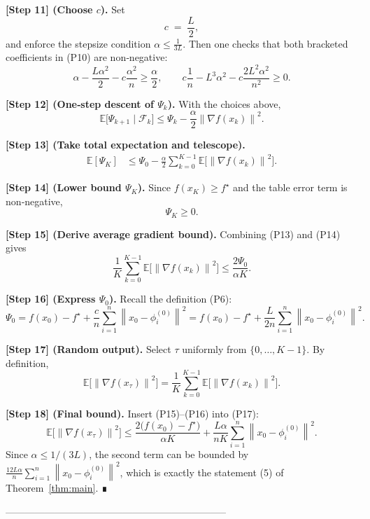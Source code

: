 \documentclass{article}
\newcommand{\E}{\mathbb{E}}
\newcommand{\norm}[1]{\left\|#1\right\|}
\newcommand{\grad}{\nabla}
\begin{document}
\noindent\textbf{[Step 11] (Choose $c$).}  
Set
\[
c \;=\; \frac{L}{2},
\]
and enforce the stepsize condition $\alpha\le \frac{1}{3L}$.  
Then one checks that both bracketed coefficients in (P10) are non‑negative:
\[
\alpha-\frac{L\alpha^{2}}{2}-c\frac{\alpha^{2}}{n}
\ge \frac{\alpha}{2},
\qquad
c\frac1n - L^{3}\alpha^{2}
      -c\frac{2L^{2}\alpha^{2}}{n^{2}}
\ge 0.
\tag{P11}
\]

\noindent\textbf{[Step 12] (One‑step descent of $\Psi_k$).}  
With the choices above,
\[
\E\!\bigl[\Psi_{k+1}\mid\mathcal{F}_k\bigr]\le
\Psi_k -\frac{\alpha}{2}\norm{\grad f(x_k)}^{2}.
\tag{P12}
\]

\noindent\textbf{[Step 13] (Take total expectation and telescope).}
\[
\begin{aligned}
\E[\Psi_{K}]
&\le \Psi_{0} -\frac{\alpha}{2}\sum_{k=0}^{K-1}\E\!\bigl[\norm{\grad f(x_k)}^{2}\bigr].
\end{aligned}
\tag{P13}
\]

\noindent\textbf{[Step 14] (Lower bound $\Psi_{K}$).}  
Since $f(x_{K})\ge f^{\star}$ and the table error term is non‑negative,
\[
\Psi_{K}\ge 0.
\tag{P14}
\]

\noindent\textbf{[Step 15] (Derive average gradient bound).}  
Combining (P13) and (P14) gives
\[
\frac{1}{K}\sum_{k=0}^{K-1}\E\!\bigl[\norm{\grad f(x_k)}^{2}\bigr]
\le \frac{2\Psi_{0}}{\alpha K}.
\tag{P15}
\]

\noindent\textbf{[Step 16] (Express $\Psi_{0}$).}  
Recall the definition (P6):
\[
\Psi_{0}=f(x_{0})-f^{\star}
          +\frac{c}{n}\sum_{i=1}^{n}\norm{x_{0}-\phi_i^{(0)}}^{2}
        =f(x_{0})-f^{\star}
          +\frac{L}{2n}\sum_{i=1}^{n}\norm{x_{0}-\phi_i^{(0)}}^{2}.
\tag{P16}
\]

\noindent\textbf{[Step 17] (Random output).}  
Select $\tau$ uniformly from $\{0,\dots,K-1\}$. By definition,
\[
\E\!\bigl[\norm{\grad f(x_{\tau})}^{2}\bigr]
= \frac{1}{K}\sum_{k=0}^{K-1}\E\!\bigl[\norm{\grad f(x_k)}^{2}\bigr].
\tag{P17}
\]

\noindent\textbf{[Step 18] (Final bound).}  
Insert (P15)–(P16) into (P17):
\[
\E\!\bigl[\norm{\grad f(x_{\tau})}^{2}\bigr]
\le \frac{2\bigl(f(x_{0})-f^{\star}\bigr)}{\alpha K}
   +\frac{L\alpha}{nK}\sum_{i=1}^{n}\norm{x_{0}-\phi_i^{(0)}}^{2}.
\]
Since $\alpha\le 1/(3L)$, the second term can be bounded by
$\frac{12L\alpha}{n}\sum_{i=1}^{n}\norm{x_{0}-\phi_i^{(0)}}^{2}$,
which is exactly the statement (5) of Theorem~\ref{thm:main}. ∎

--------------------------------------------------------------------
\end{document}

